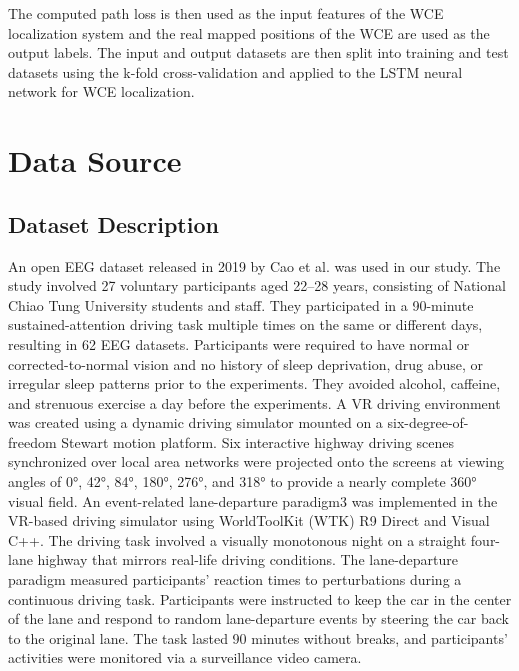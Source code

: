 \documentclass{IEEE_lsens}
\begin{document}
The computed path loss is then used as the input features of the WCE localization system and the real mapped positions of the WCE are used as the output labels. The input and output datasets are then split into training and test datasets using the k-fold cross-validation and applied to the LSTM neural network for WCE localization.

\vspace{-0.2cm}
\section{Data Source}
\vspace{-0.1cm}
\subsection{Dataset Description}
An open EEG dataset released in 2019 by Cao et al. was used in our study. The study involved 27 voluntary participants aged 22–28 years, consisting of National Chiao Tung University students and staff. They participated in a 90-minute sustained-attention driving task multiple times on the same or different days, resulting in 62 EEG datasets. Participants were required to have normal or corrected-to-normal vision and no history of sleep deprivation, drug abuse, or irregular sleep patterns prior to the experiments. They avoided alcohol, caffeine, and strenuous exercise a day before the experiments. A VR driving environment was created using a dynamic driving simulator mounted on a six-degree-of-freedom Stewart motion platform. Six interactive highway driving scenes synchronized over local area networks were projected onto the screens at viewing angles of 0°, 42°, 84°, 180°, 276°, and 318° to provide a nearly complete 360° visual field.  An event-related lane-departure paradigm3 was implemented in the VR-based driving simulator using WorldToolKit (WTK) R9 Direct and Visual C++.  The driving task involved a visually monotonous night on a straight four-lane highway that mirrors real-life driving conditions. The lane-departure paradigm measured participants' reaction times to perturbations during a continuous driving task. Participants were instructed to keep the car in the center of the lane and respond to random lane-departure events by steering the car back to the original lane. The task lasted 90 minutes without breaks, and participants' activities were monitored via a surveillance video camera.
\end{document}
